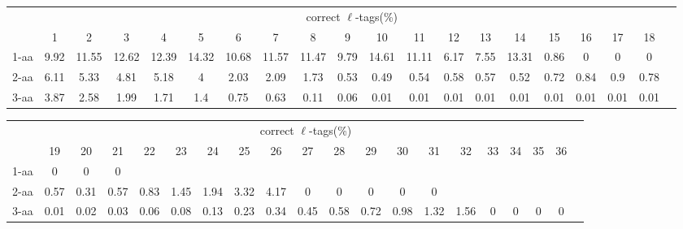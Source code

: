 \documentclass{article}
\begin{document}
\begin{table}[h]\tiny
\vspace{3mm}
{\centering
\begin{center}
\begin{tabular}{|l|c|c|c|c|c|c|c|c|c|c|c|c|c|c|c|c|c|c|c|}
  \hline
  & \multicolumn{ 18 }{|c|}{correct $\ell$-tags(\%)} \\
  \cline{2- 19}
    & 1 & 2 & 3 & 4 & 5 & 6 & 7 & 8 & 9 & 10 & 11 & 12 & 13 & 14 & 15 & 16 & 17 & 18\\
  \hline
1-aa  & 9.92 & 11.55 & 12.62 & 12.39 & 14.32 & 10.68 & 11.57 & 11.47 & 9.79 & 14.61 & 11.11 & 6.17 & 7.55 & 13.31 & 0.86 & 0 & 0 & 0\\
2-aa  & 6.11 & 5.33 & 4.81 & 5.18 & 4 & 2.03 & 2.09 & 1.73 & 0.53 & 0.49 & 0.54 & 0.58 & 0.57 & 0.52 & 0.72 & 0.84 & 0.9 & 0.78\\
3-aa  & 3.87 & 2.58 & 1.99 & 1.71 & 1.4 & 0.75 & 0.63 & 0.11 & 0.06 & 0.01 & 0.01 & 0.01 & 0.01 & 0.01 & 0.01 & 0.01 & 0.01 & 0.01\\
 \hline
\end{tabular}
\end{center}
\par}
\centering

\vspace{3mm}
\label{table:table4}
\end{table}
\begin{table}[h]\tiny
\vspace{3mm}
{\centering
\begin{center}
\begin{tabular}{|l|c|c|c|c|c|c|c|c|c|c|c|c|c|c|c|c|c|c|c|}
  \hline
  & \multicolumn{ 18 }{|c|}{correct $\ell$-tags(\%)} \\
  \cline{2- 19}
    & 19 & 20 & 21 & 22 & 23 & 24 & 25 & 26 & 27 & 28 & 29 & 30 & 31 & 32 & 33 & 34 & 35 & 36\\
  \hline
1-aa  & 0 & 0 & 0 &  &  &  &  &  &  &  &  &  &  &  &  &  &  & \\
2-aa  & 0.57 & 0.31 & 0.57 & 0.83 & 1.45 & 1.94 & 3.32 & 4.17 & 0 & 0 & 0 & 0 & 0 &  &  &  &  & \\
3-aa  & 0.01 & 0.02 & 0.03 & 0.06 & 0.08 & 0.13 & 0.23 & 0.34 & 0.45 & 0.58 & 0.72 & 0.98 & 1.32 & 1.56 & 0 & 0 & 0 & 0\\
 \hline
\end{tabular}
\end{center}
\par}
\centering

\vspace{3mm}
\label{table:table4}
\end{table}
\end{document}
